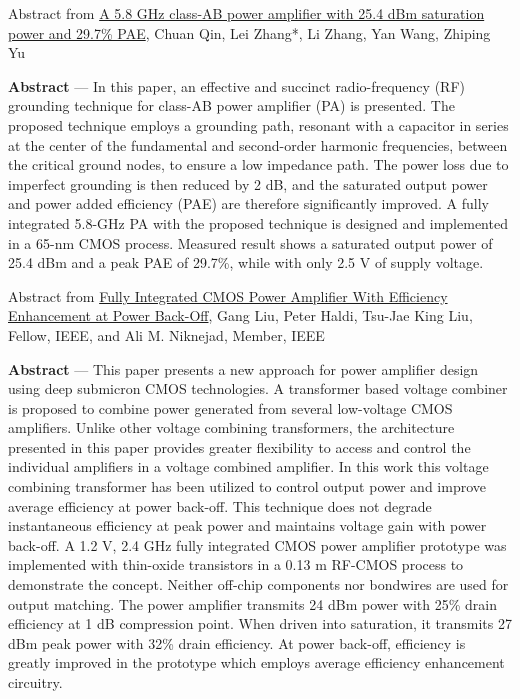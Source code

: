 \documentclass{article}
\begin{document}

Abstract from \href{https://www.sciengine.com/SCIS/doi/10.1007/s11432-016-0299-4?&trans=true}{A 5.8 GHz class-AB power amplifier with 25.4 dBm saturation power and 29.7\% PAE}, Chuan Qin,  Lei Zhang*,  Li Zhang,  Yan Wang,  Zhiping Yu

\begin{info}
	\textbf{Abstract} — In this paper, an effective and succinct radio-frequency (RF) grounding technique for class-AB power amplifier (PA) is presented. The proposed technique employs a grounding path, resonant with a capacitor in series at the center of the fundamental and second-order harmonic frequencies, between the critical ground nodes, to ensure a low impedance path. The power loss due to imperfect grounding is then reduced by 2 dB, and the saturated output power and power added efficiency (PAE) are therefore significantly improved. A fully integrated 5.8-GHz PA with the proposed technique is designed and implemented in a 65-nm CMOS process. Measured result shows a saturated output power of 25.4 dBm and a peak PAE of 29.7\%, while with only 2.5 V of supply voltage.
\end{info}


Abstract from \href{https://ieeexplore.ieee.org/document/4456783}{Fully Integrated CMOS Power Amplifier With Efficiency Enhancement at Power Back-Off}, Gang Liu, Peter Haldi, Tsu-Jae King Liu, Fellow, IEEE, and Ali M. Niknejad, Member, IEEE

\begin{info}
	\textbf{Abstract} — This paper presents a new approach for power amplifier design using deep submicron CMOS technologies. A transformer based voltage combiner is proposed to combine power generated from several low-voltage CMOS amplifiers. Unlike other voltage combining transformers, the architecture presented in this paper provides greater flexibility to access and control the individual amplifiers in a voltage combined amplifier. In this work this voltage combining transformer has been utilized to control output power and improve average efficiency at power back-off. This technique does not degrade instantaneous efficiency at peak power and maintains voltage gain with power back-off. A 1.2 V, 2.4 GHz fully integrated CMOS power amplifier prototype was implemented with thin-oxide transistors in a 0.13 m RF-CMOS process to demonstrate the concept. Neither off-chip components nor bondwires are used for output matching. The power amplifier transmits 24 dBm power with 25\% drain efficiency at 1 dB compression point. When driven into saturation, it transmits 27 dBm peak power with 32\% drain efficiency. At power back-off, efficiency is greatly improved in the prototype which employs average efficiency enhancement circuitry.
\end{info}
\end{document}
